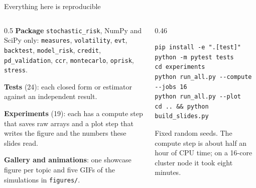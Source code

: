 \begin{frame}[fragile]{Everything here is reproducible}
  \begin{columns}[T]
    \begin{column}{0.5\textwidth}
      \small
      \textbf{Package} \texttt{stochastic\_risk}, NumPy and SciPy only: \texttt{measures}, \texttt{volatility}, \texttt{evt}, \texttt{backtest}, \texttt{model\_risk}, \texttt{credit}, \texttt{pd\_validation}, \texttt{ccr}, \texttt{montecarlo}, \texttt{oprisk}, \texttt{stress}.
      \vspace{0.3em}

      \textbf{Tests} (24): each closed form or estimator against an independent result.

      \textbf{Experiments} (19): each has a compute step that saves raw arrays and a plot step that writes the figure and the numbers these slides read.

      \textbf{Gallery and animations}: one showcase figure per topic and five GIFs of the simulations in \texttt{figures/}.
    \end{column}
    \begin{column}{0.46\textwidth}
      \scriptsize
\begin{verbatim}
pip install -e ".[test]"
python -m pytest tests
cd experiments
python run_all.py --compute --jobs 16
python run_all.py --plot
cd .. && python build_slides.py
\end{verbatim}
      \small
      Fixed random seeds. The compute step is about half an hour of CPU time; on a 16-core cluster node it took eight minutes.
    \end{column}
  \end{columns}
\end{frame}

